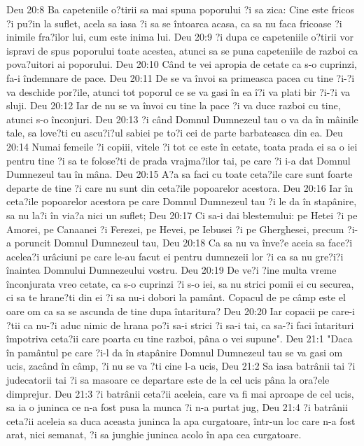 Deu 20:8  Ba capeteniile o?tirii sa mai spuna poporului ?i sa zica: Cine este fricos ?i pu?in la suflet, acela sa iasa ?i sa se întoarca acasa, ca sa nu faca fricoase ?i inimile fra?ilor lui, cum este inima lui.
Deu 20:9  ?i dupa ce capeteniile o?tirii vor ispravi de spus poporului toate acestea, atunci sa se puna capeteniile de razboi ca pova?uitori ai poporului.
Deu 20:10  Când te vei apropia de cetate ca s-o cuprinzi, fa-i îndemnare de pace.
Deu 20:11  De se va învoi sa primeasca pacea cu tine ?i-?i va deschide por?ile, atunci tot poporul ce se va gasi în ea î?i va plati bir ?i-?i va sluji.
Deu 20:12  Iar de nu se va învoi cu tine la pace ?i va duce razboi cu tine, atunci s-o înconjuri.
Deu 20:13  ?i când Domnul Dumnezeul tau o va da în mâinile tale, sa love?ti cu ascu?i?ul sabiei pe to?i cei de parte barbateasca din ea.
Deu 20:14  Numai femeile ?i copiii, vitele ?i tot ce este în cetate, toata prada ei sa o iei pentru tine ?i sa te folose?ti de prada vrajma?ilor tai, pe care ?i i-a dat Domnul Dumnezeul tau în mâna.
Deu 20:15  A?a sa faci cu toate ceta?ile care sunt foarte departe de tine ?i care nu sunt din ceta?ile popoarelor acestora.
Deu 20:16  Iar în ceta?ile popoarelor acestora pe care Domnul Dumnezeul tau ?i le da în stapânire, sa nu la?i în via?a nici un suflet;
Deu 20:17  Ci sa-i dai blestemului: pe Hetei ?i pe Amorei, pe Canaanei ?i Ferezei, pe Hevei, pe Iebusei ?i pe Gherghesei, precum ?i-a poruncit Domnul Dumnezeul tau,
Deu 20:18  Ca sa nu va înve?e aceia sa face?i acelea?i urâciuni pe care le-au facut ei pentru dumnezeii lor ?i ca sa nu gre?i?i înaintea Domnului Dumnezeului vostru.
Deu 20:19  De ve?i ?ine multa vreme înconjurata vreo cetate, ca s-o cuprinzi ?i s-o iei, sa nu strici pomii ei cu securea, ci sa te hrane?ti din ei ?i sa nu-i dobori la pamânt. Copacul de pe câmp este el oare om ca sa se ascunda de tine dupa întaritura?
Deu 20:20  Iar copacii pe care-i ?tii ca nu-?i aduc nimic de hrana po?i sa-i strici ?i sa-i tai, ca sa-?i faci întarituri împotriva ceta?ii care poarta cu tine razboi, pâna o vei supune".
Deu 21:1  "Daca în pamântul pe care ?i-l da în stapânire Domnul Dumnezeul tau se va gasi om ucis, zacând în câmp, ?i nu se va ?ti cine l-a ucis,
Deu 21:2  Sa iasa batrânii tai ?i judecatorii tai ?i sa masoare ce departare este de la cel ucis pâna la ora?ele dimprejur.
Deu 21:3  ?i batrânii ceta?ii aceleia, care va fi mai aproape de cel ucis, sa ia o juninca ce n-a fost pusa la munca ?i n-a purtat jug,
Deu 21:4  ?i batrânii ceta?ii aceleia sa duca aceasta juninca la apa curgatoare, într-un loc care n-a fost arat, nici semanat, ?i sa junghie juninca acolo în apa cea curgatoare.

